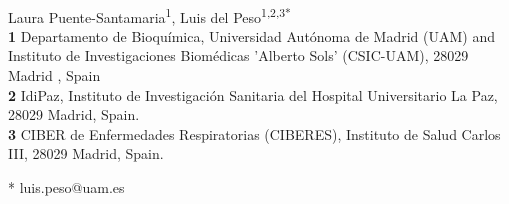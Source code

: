 \documentclass[10pt,letterpaper]{article}
\date{}
\begin{document}
\vspace*{0.2in}

\begin{flushleft}
{\Large
\textbf{} %
}
\newline
\\
Laura Puente-Santamaria\textsuperscript{1},
Luis del Peso\textsuperscript{1,2,3*}
\\
\bigskip
\textbf{1} Departamento de Bioquímica, Universidad Autónoma de Madrid (UAM) and Instituto de Investigaciones Biomédicas 'Alberto Sols' (CSIC-UAM), 28029 Madrid , Spain
\\
\textbf{2} IdiPaz, Instituto de Investigación Sanitaria del Hospital Universitario La Paz, 28029 Madrid, Spain.
\\
\textbf{3} CIBER de Enfermedades Respiratorias (CIBERES), Instituto de Salud Carlos III, 28029 Madrid, Spain.
\\
\bigskip

% 
%





* luis.peso@uam.es

\end{flushleft}
\end{document}
